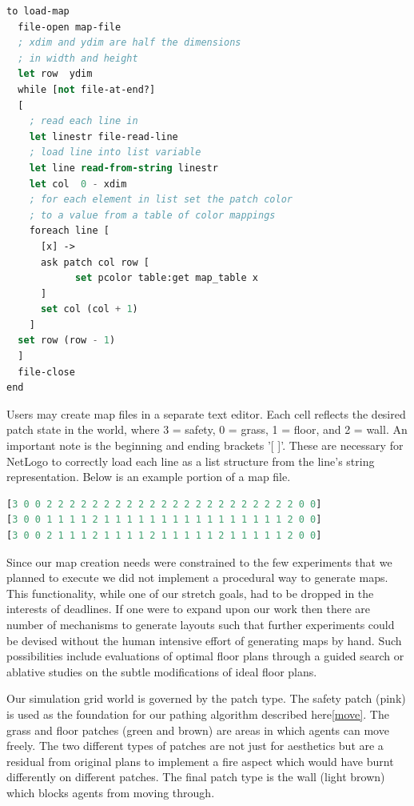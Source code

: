 \documentclass[12pt,letterpaper]{article}
\begin{document}
\begin{lstlisting}[language=lisp, caption={Map loading procedure in NetLogo},captionpos=b, frame=single]
to load-map
  file-open map-file
  ; xdim and ydim are half the dimensions
  ; in width and height
  let row  ydim
  while [not file-at-end?]
  [
    ; read each line in	
    let linestr file-read-line
    ; load line into list variable
    let line read-from-string linestr
    let col  0 - xdim
    ; for each element in list set the patch color 
    ; to a value from a table of color mappings
    foreach line [      
      [x] ->
      ask patch col row [ 
            set pcolor table:get map_table x 
      ]
      set col (col + 1)
    ]
  set row (row - 1)
  ]
  file-close
end
\end{lstlisting}

Users may create map files in a separate text editor. Each cell reflects the desired patch state in the world, where 3 = safety, 0 = grass, 1 = floor, and 2 = wall. An important note is the beginning and ending brackets '[ ]'.  These are necessary for NetLogo to correctly load each line as a list structure from the line's string representation.  Below is an example portion of a map file.  

\begin{lstlisting}[language=lisp, caption={Example map file, 3 rows},captionpos=b, frame=single]
[3 0 0 2 2 2 2 2 2 2 2 2 2 2 2 2 2 2 2 2 2 2 2 2 2 0 0]
[3 0 0 1 1 1 1 2 1 1 1 1 1 1 1 1 1 1 1 1 1 1 1 1 2 0 0]
[3 0 0 2 1 1 1 2 1 1 1 1 2 1 1 1 1 1 2 1 1 1 1 1 2 0 0]
\end{lstlisting}

Since our map creation needs were constrained to the few experiments that we planned to execute we did not implement a procedural way to generate maps.  This functionality, while one of our stretch goals, had to be dropped in the interests of deadlines.  If one were to expand upon our work then there are number of mechanisms to generate layouts \cite{mirahmadiNovelAlgorithmRealtime2012} such that further experiments could be devised without the human intensive effort of generating maps by hand.  Such possibilities include evaluations of optimal floor plans through a guided search or ablative studies on the subtle modifications of ideal floor plans.

Our simulation grid world is governed by the patch type.  The safety patch (pink) is used as the foundation for our pathing algorithm described here\ref{move}.  The grass and floor patches (green and brown) are areas in which agents can  move freely.  The two different types of patches are not just for aesthetics but are a residual from original plans to implement a fire aspect which would have burnt differently on different patches.  The final patch type is the wall (light brown) which blocks agents from moving through.
\end{document}
